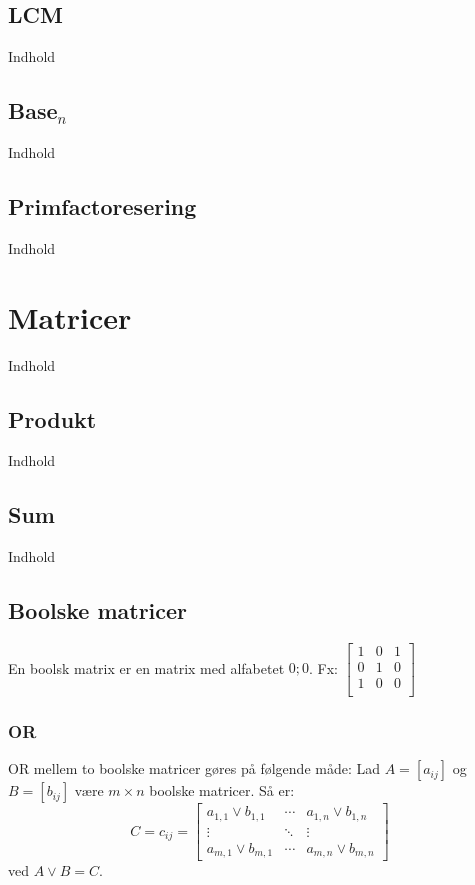 \documentclass[a4paper]{article}
\begin{document}
  \subsection{LCM}
    Indhold
  \subsection{Base$_n$}
    Indhold
  \subsection{Primfactoresering}
    Indhold
\section{Matricer}
  Indhold
  \subsection{Produkt}
    Indhold
  \subsection{Sum}
    Indhold
  \subsection{Boolske matricer}
    En boolsk matrix er en matrix med alfabetet ${0;0}$. Fx:
    $\left[\begin{smallmatrix}
      1 & 0 & 1 \\
      0 & 1 & 0 \\
      1 & 0 & 0  \\
    \end{smallmatrix}\right]$
    \subsubsection{OR}
      OR mellem to boolske matricer gøres på følgende måde:
      Lad $A = [a_{ij}]$ og $B= [b_{ij}]$ være $m \times n$ boolske matricer. Så er:
      \begin{equation}
        C = c_{ij} = \begin{bmatrix}
                    a_{1,1} \vee b_{1,1} & \cdots & a_{1,n} \vee b_{1,n} \\
                    \vdots               & \ddots & \vdots \\
                    a_{m,1} \vee b_{m,1} & \cdots & a_{m,n} \vee b_{m,n}
                  \end{bmatrix}
      \end{equation}
      ved $A \vee B = C$.
\end{document}
